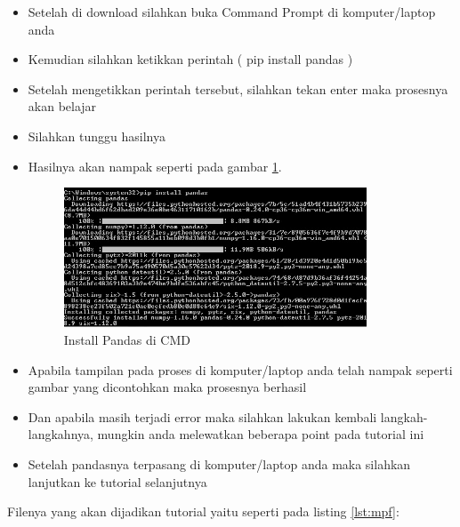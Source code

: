 \begin{enumerate}
\begin{itemize}
\item Setelah di download silahkan buka Command Prompt di komputer/laptop anda
\item Kemudian silahkan ketikkan perintah ( pip install pandas )
\item Setelah mengetikkan perintah tersebut, silahkan tekan enter maka prosesnya akan belajar
\item Silahkan tunggu hasilnya
\item Hasilnya akan nampak seperti pada gambar \ref{fig:ipc}.
\begin{figure}[!htbp]
	\centerline{\includegraphics[width=0.85\textwidth]{figures/10/ipc.PNG}}
	\caption{Install Pandas di CMD}
	\label{fig:ipc}
\end{figure}

\item Apabila tampilan pada proses di komputer/laptop anda telah nampak seperti gambar yang dicontohkan maka prosesnya berhasil
\item Dan apabila masih terjadi error maka silahkan lakukan kembali langkah-langkahnya, mungkin anda melewatkan beberapa point pada tutorial ini
\item Setelah pandasnya terpasang di komputer/laptop anda maka silahkan lanjutkan ke tutorial selanjutnya
\end{itemize}
\end{enumerate}

Filenya yang akan dijadikan tutorial yaitu seperti pada listing \ref{lst:mpf}:


